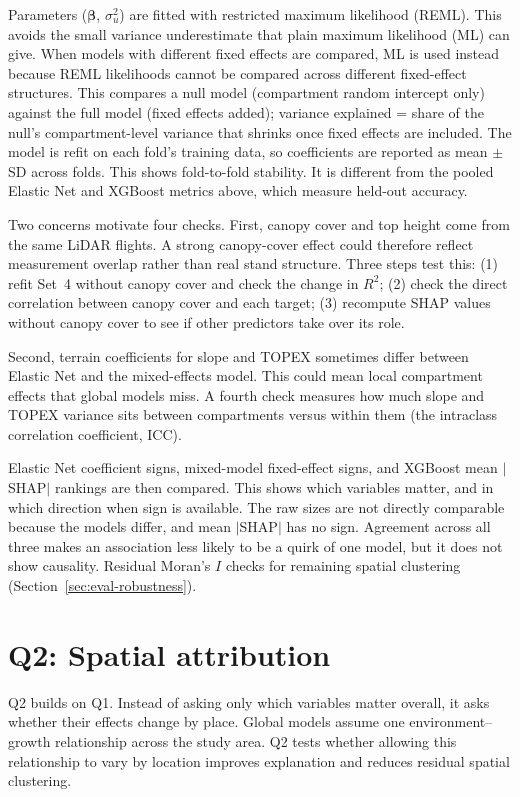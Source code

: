 Parameters ($\boldsymbol{\beta}$, $\sigma_u^2$) are fitted with restricted maximum likelihood (REML). This avoids the small variance underestimate that plain maximum likelihood (ML) can give. When models with different fixed effects are compared, ML is used instead because REML likelihoods cannot be compared across different fixed-effect structures. This compares a null model (compartment random intercept only) against the full model (fixed effects added); variance explained = share of the null's compartment-level variance that shrinks once fixed effects are included. The model is refit on each fold's training data, so coefficients are reported as mean $\pm$ SD across folds. This shows fold-to-fold stability. It is different from the pooled Elastic Net and XGBoost metrics above, which measure held-out accuracy.

Two concerns motivate four checks. First, canopy cover and top height come from the same LiDAR flights. A strong canopy-cover effect could therefore reflect measurement overlap rather than real stand structure. Three steps test this: (1) refit Set~4 without canopy cover and check the change in $R^2$; (2) check the direct correlation between canopy cover and each target; (3) recompute SHAP values without canopy cover to see if other predictors take over its role.

Second, terrain coefficients for slope and TOPEX sometimes differ between Elastic Net and the mixed-effects model. This could mean local compartment effects that global models miss. A fourth check measures how much slope and TOPEX variance sits between compartments versus within them (the intraclass correlation coefficient, ICC).

Elastic Net coefficient signs, mixed-model fixed-effect signs, and XGBoost mean $|$SHAP$|$ rankings are then compared. This shows which variables matter, and in which direction when sign is available. The raw sizes are not directly comparable because the models differ, and mean $|$SHAP$|$ has no sign. Agreement across all three makes an association less likely to be a quirk of one model, but it does not show causality. Residual Moran's $I$ checks for remaining spatial clustering (Section~\ref{sec:eval-robustness}).


\section{Q2: Spatial attribution}
Q2 builds on Q1. Instead of asking only which variables matter overall, it asks whether their effects change by place. Global models assume one environment--growth relationship across the study area. Q2 tests whether allowing this relationship to vary by location improves explanation and reduces residual spatial clustering.

